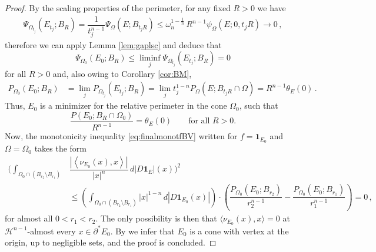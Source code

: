 \documentclass[a4paper,reqno,11pt]{amsart}
\newcommand{\Hau}{{\mathcal H}} %
\newcommand{\de}{\partial}
\newcommand{\ch}{\mathbf{1}}
\newcommand{\pr}{P_{\Omega}}
\newcommand{\p}{P}
\begin{document}
\begin{proof}
By the scaling properties of the perimeter, for any fixed $R>0$ we have
\begin{align*}
\Psi_{\Omega_{t_j}}(E_{t_{j}};B_{R}) = \dfrac{1}{t_{j}^{n-1}} \Psi_{\Omega}(E;B_{t_{j} R}) \leq
\omega_{n}^{1 - \frac{1}{n}} \, R^{n-1} \psi_{\Omega}(E; 0, t_{j} R) \longrightarrow 0 \, , %
\end{align*}
therefore we can apply Lemma \ref{lem:gaplsc} and deduce that 
\[
\Psi_{\Omega_{0}}(E_{0};B_{R}) \le \liminf_{j}\Psi_{\Omega_{t_{j}}}(E_{t_{j}};B_{R}) = 0
\] 
for all $R>0$ and, also owing to Corollary \ref{cor:BM},
\begin{align*}
\p_{\Omega_{0}}(E_{0};B_{R}) &= \lim_{j}\p_{\Omega_{t_{j}}}(E_{t_{j}};B_{R}) = \lim_{j}t_{j}^{1-n}\pr(E;B_{t_{j}R}\cap \Omega) = R^{n-1}\theta_{E}(0)\,.
\end{align*}
Thus, $E_{0}$ is a minimizer for the relative perimeter in the cone $\Omega_{0}$, such that 
\[
\frac{\p(E_{0};B_{R}\cap \Omega_{0})}{R^{n-1}} = \theta_{E}(0)\qquad \text{for all $R>0$.}
\]
Now, the monotonicity inequality \eqref{eq:finalmonotfBV} written for $f = \ch_{E_{0}}$ and $\Omega=\Omega_{0}$ takes the form
\begin{align*}
\Bigg( \int_{\Omega_{0} \cap (B_{r_{2}} \setminus B_{r_{1}})}& \dfrac{| \left\langle \nu_{E_{0}}(x) , x \right\rangle|}{|x|^{n}} \, d |D\ch_{E}|(x) \Bigg)^{2}\\
& \leq \left( \int_{\Omega_{0} \cap (B_{r_{2}} \setminus B_{r_{1}})} |x|^{1-n} \, d |D\ch_{E_{0}}(x)| \right) \cdot \left( \dfrac{\p_{\Omega_{0}}(E_{0}; B_{r_{2}})}{r_{2}^{n-1}}  - \dfrac{\p_{\Omega_{0}}(E_{0}; B_{r_{1}})}{r_{1}^{n-1}} \right) = 0 \, ,
\end{align*}
for almost all $0 < r_{1} < r_{2}$. The only possibility is then that $\langle \nu_{E_{0}}(x), x \rangle = 0$ at $\Hau^{n-1}$-almost every $x \in \de^{\ast} E_{0}$. By \cite[Proposition 28.8]{maggi2012sets} we infer that $E_{0}$ is a cone with vertex at the origin, up to negligible sets, and the proof is concluded.
\end{proof}

	
\end{document}
